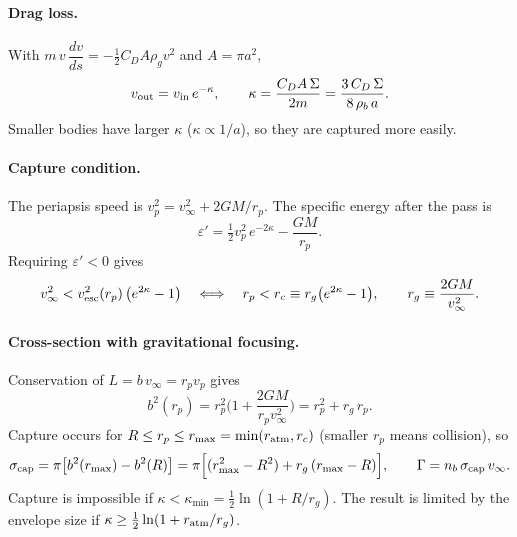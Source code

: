 \documentclass{article}
\begin{document}
\paragraph{Drag loss.} With $m\,v\,\dfrac{dv}{ds}=-\tfrac12 C_D A\rho_g v^{2}$ and $A=\pi a^{2}$,
\begin{equation}
v_{\rm out}=v_{\rm in}\,e^{-\kappa},\qquad
\kappa=\frac{C_D A\,\Sigma}{2m}=\frac{3\,C_D\,\Sigma}{8\,\rho_b\,a}.
\end{equation}
Smaller bodies have larger $\kappa$ ($\kappa\propto 1/a$), so they are captured more easily.

\paragraph{Capture condition.}
The periapsis speed is $v_p^{2}=v_\infty^{2}+2GM/r_p$. The specific energy after the pass is
\begin{equation}
\varepsilon'=\tfrac12 v_p^{2}\,e^{-2\kappa}-\frac{GM}{r_p}.
\end{equation}
Requiring $\varepsilon'<0$ gives
\begin{equation}
v_\infty^{2}<v_{\rm esc}^{2}(r_p)\,\big(e^{2\kappa}-1\big)
\quad\Longleftrightarrow\quad
r_p<r_c\equiv r_g\big(e^{2\kappa}-1\big),\qquad
r_g\equiv\frac{2GM}{v_\infty^{2}}.
\end{equation}

\paragraph{Cross-section with gravitational focusing.}
Conservation of $L=b\,v_\infty=r_p v_p$ gives
\begin{equation}
b^{2}(r_p)=r_p^{2}\Big(1+\frac{2GM}{r_p v_\infty^{2}}\Big)=r_p^{2}+r_g\,r_p .
\end{equation}
Capture occurs for $R\le r_p\le r_{\max}=\min(r_{\rm atm},r_c)$ (smaller $r_p$ means collision), so
\begin{equation}
\sigma_{\rm cap}=\pi\big[b^{2}(r_{\max})-b^{2}(R)\big]
=\pi\Big[(r_{\max}^{2}-R^{2})+r_g\,(r_{\max}-R)\Big],
\qquad
\Gamma=n_b\,\sigma_{\rm cap}\,v_\infty .
\end{equation}
Capture is impossible if $\kappa<\kappa_{\min}=\tfrac12\ln(1+R/r_g)$. The result is limited
by the envelope size if $\kappa\ge\tfrac12\ln(1+r_{\rm atm}/r_g)$.
\end{document}
